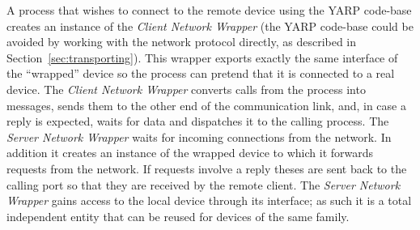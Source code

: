 A process that wishes to connect to the remote device using
the YARP code-base
creates an instance of the \emph{Client Network Wrapper}
(the YARP code-base could be avoided by working with the network
protocol directly, as described in Section~\ref{sec:transporting}).
%
This wrapper exports 
exactly the same interface of the 
``wrapped'' device so the process can pretend that it is connected to 
a real device. The \emph{Client Network Wrapper} converts calls from 
the process into messages, sends them to the other end of the 
communication link, and, in case a reply is expected, waits for data and 
dispatches it to the calling process. 
%
The \emph{Server Network Wrapper} waits for incoming connections from 
the network. 
In addition it creates an instance of the wrapped 
device to which it forwards requests from the network. If requests
involve a reply theses are sent back to the 
calling port so that they are received by the remote client. The 
\emph{Server Network Wrapper} gains access to the local device through its 
interface; as such it is a total independent 
entity that can be reused for devices of the same family.
%




